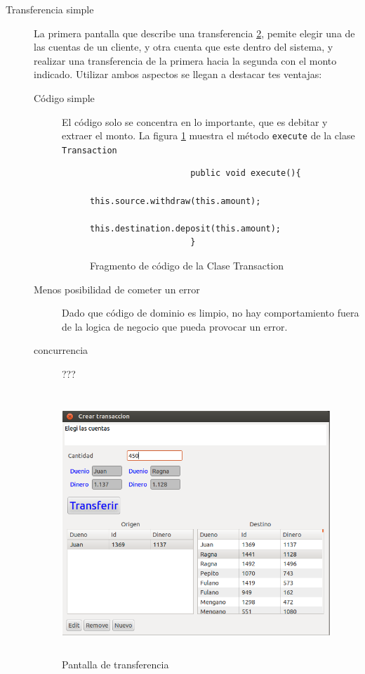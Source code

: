 \begin{description}

	\item[Transferencia simple]
		La primera pantalla que describe una transferencia \ref{trasferenciaSimple},
		pemite elegir una de las cuentas de un cliente, y otra cuenta que este dentro
		del sistema, y realizar una transferencia de la primera hacia la segunda con el
		monto indicado. Utilizar ambos aspectos se llegan a destacar tes ventajas:
		
		\begin{description}
			\item[Código simple] El código solo se concentra en lo importante, que es
			debitar y extraer el monto.
			La figura \ref{executeTransaction} muestra el método  \lstinline|execute| de la
			clase \lstinline|Transaction| 
			\begin{figure}[h]
				\begin{lstlisting}
					public void execute(){
						this.source.withdraw(this.amount);
						this.destination.deposit(this.amount);
					}
				\end{lstlisting}
				\caption{Fragmento de código de la Clase Transaction}
				\label{executeTransaction}
			\end{figure}
			 
			\item[Menos posibilidad de cometer un error] Dado que código de dominio es
			limpio, no hay comportamiento fuera de la logica de negocio que pueda provocar
			un error.
			\item[concurrencia]???
		\end{description}
		
		
		\begin{figure}[h]
			\centering
			\includegraphics[width=450px, height=375px]{img/simple-transferencia}
			\caption{Pantalla de transferencia}
			\label{trasferenciaSimple}
		\end{figure}
		

\end{description}
